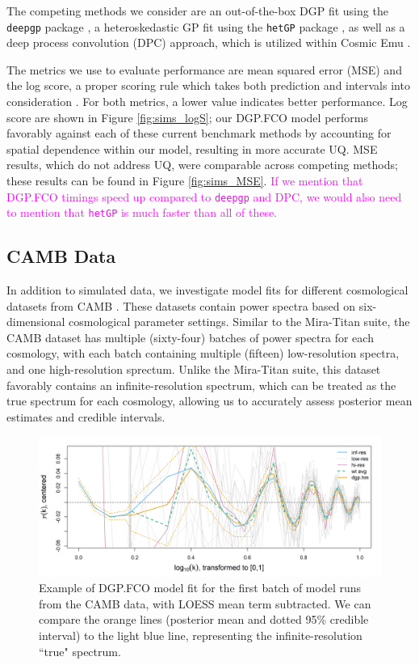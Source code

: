\documentclass[11pt]{article}
\begin{document}
The competing methods we consider are an out-of-the-box DGP fit using the 
\texttt{deepgp} package \citep{sauer2023active}, a heteroskedastic GP fit using 
the \texttt{hetGP} package \citep{binois2018practical, binois2021hetgp}, as well 
as a deep process convolution (DPC) approach, which is utilized within Cosmic 
Emu \citep{moran2023mira}. 

The metrics we use to evaluate performance are mean squared error (MSE) and the 
log score, a proper scoring rule which takes both prediction and intervals into 
consideration \citep{gneiting2007strictly}. For both metrics, a lower value indicates 
better performance. Log score are shown in Figure \ref{fig:sims_logS}; our DGP.FCO 
model performs favorably against each of these current benchmark methods by
accounting for spatial dependence within our model, resulting in more accurate UQ.
MSE results, which do not address UQ, were comparable across competing methods; these results
can be found in Figure \ref{fig:sims_MSE}. \textcolor{magenta}{If we mention that DGP.FCO timings 
speed up compared to \texttt{deepgp} and DPC, we would also need to mention that \texttt{hetGP} 
is much faster than all of these.}

\subsection{CAMB Data}
\label{subsec:camb}

In addition to simulated data, we investigate model fits for different cosmological 
datasets from CAMB \citep{lewis2011CAMB}. These datasets contain power spectra based
on six-dimensional cosmological parameter settings. Similar to the Mira-Titan suite, the
CAMB dataset has multiple (sixty-four) batches of power spectra for each cosmology, with each batch 
containing multiple (fifteen) low-resolution spectra, and one high-resolution sprectum. 
Unlike the Mira-Titan suite, this dataset favorably contains an infinite-resolution 
spectrum, which can be treated as the true spectrum for each cosmology,
allowing us to accurately assess posterior mean estimates and credible intervals. 

\begin{figure}
    \centering
    \includegraphics[width=\textwidth]{CAMB_fit_model1.png}
    \caption{Example of DGP.FCO model fit for the first batch of model runs from the CAMB data, 
             with LOESS mean term subtracted. We can compare the orange lines 
             (posterior mean and dotted 95\% credible interval) to the light blue line,
             representing the infinite-resolution ``true" spectrum.}   
    \label{fig:fit_camb}
\end{figure}
\end{document}
